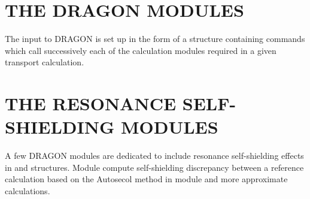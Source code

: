 \section{THE DRAGON MODULES}\label{sect:DragonModuleInput}

The input to DRAGON is set up in the form of a structure containing commands
which call successively each of the calculation modules required in a given
transport calculation.


\section{THE RESONANCE SELF-SHIELDING MODULES}\label{sect:SSModuleInput}

A few DRAGON modules are dedicated to include resonance self-shielding effects in  and
 structures. Module  compute self-shielding discrepancy between a reference
calculation based on the Autosecol method in module  and more approximate calculations.\cite{autosecol,vdg}

